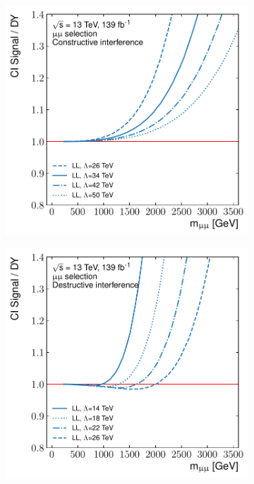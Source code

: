\begin{figure}[]
\begin{subfigure}[b]{0.49\textwidth}
        \label{fig:datamc:sigShape2}
    \end{subfigure}
    \begin{subfigure}[b]{0.49\textwidth}
        \centering
        \includegraphics[width=\textwidth]{figures/analysis/datamc/sigmodel/fit-const-mm-backgroundModel.pdf}
    
        \label{fig:datamc:sigShape3}
    \end{subfigure}
    \begin{subfigure}[b]{0.49\textwidth}
        \centering
        \includegraphics[width=\textwidth]{figures/analysis/datamc/sigmodel/fit-dest-mm-backgroundModel.pdf}
    

\end{subfigure}
\end{figure}
